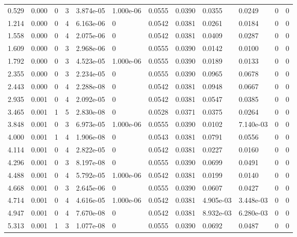 \documentclass[preview]{standalone}
\begin{document}
{{\begin{tabular}{L{1.2cm}C{1.2cm} C{0.3cm}C{0.5cm} C{1.4cm}C{1.4cm} C{1.4cm}C{1.4cm} C{1.6cm}C{1.6cm} C{1.6cm}C{1.6cm}}
  0.529  &  0.000  & 0     &  3 &  3.874e-05  & 1.000e-06  &  0.0555&   0.0390& 0.0355 & 0.0249   &  0 & 0  \\ 
  1.214  &  0.000  & 0     &  4 &  6.163e-06  & 0  &  0.0542&   0.0381& 0.0261 & 0.0184   &  0 & 0  \\ 
  1.558  &  0.000  & 0     &  4 &  2.075e-06  & 0  &  0.0542&   0.0381& 0.0409 & 0.0287   &  0 & 0  \\ 
  1.609  &  0.000  & 0     &  3 &  2.968e-06  & 0  &  0.0555&   0.0390& 0.0142 & 0.0100   &  0 & 0  \\ 
  1.792  &  0.000  & 0     &  3 &  4.523e-05  & 1.000e-06  &  0.0555&   0.0390& 0.0189 & 0.0133   &  0 & 0  \\ 
  2.355  &  0.000  & 0     &  3 &  2.234e-05  & 0  &  0.0555&   0.0390& 0.0965 & 0.0678   &  0 & 0  \\ 
  2.443  &  0.000  & 0     &  4 &  2.288e-08  & 0  &  0.0542&   0.0381& 0.0948 & 0.0667   &  0 & 0  \\ 
  2.935  &  0.001  & 0     &  4 &  2.092e-05  & 0  &  0.0542&   0.0381& 0.0547 & 0.0385   &  0 & 0  \\ 
  3.465  &  0.001  & 1     &  5 &  2.830e-08  & 0  &  0.0528&   0.0371& 0.0375 & 0.0264   &  0 & 0  \\ 
  3.848  &  0.001  & 0     &  3 &  6.973e-05  & 1.000e-06  &  0.0555&   0.0390& 0.0102 & 7.140e-03   &  0 & 0  \\ 
  4.000  &  0.001  & 1     &  4 &  1.906e-08  & 0  &  0.0543&   0.0381& 0.0791 & 0.0556   &  0 & 0  \\ 
  4.114  &  0.001  & 0     &  4 &  2.822e-05  & 0  &  0.0542&   0.0381& 0.0227 & 0.0160   &  0 & 0  \\ 
  4.296  &  0.001  & 0     &  3 &  8.197e-08  & 0  &  0.0555&   0.0390& 0.0699 & 0.0491   &  0 & 0  \\ 
  4.488  &  0.001  & 0     &  4 &  5.792e-05  & 1.000e-06  &  0.0542&   0.0381& 0.0199 & 0.0140   &  0 & 0  \\ 
  4.668  &  0.001  & 0     &  3 &  2.645e-06  & 0  &  0.0555&   0.0390& 0.0607 & 0.0427   &  0 & 0  \\ 
  4.714  &  0.001  & 0     &  4 &  4.616e-05  & 1.000e-06  &  0.0542&   0.0381& 4.905e-03 & 3.448e-03   &  0 & 0  \\ 
  4.947  &  0.001  & 0     &  4 &  7.670e-08  & 0  &  0.0542&   0.0381& 8.932e-03 & 6.280e-03   &  0 & 0  \\ 
  5.313  &  0.001  & 1     &  3 &  1.077e-08  & 0  &  0.0555&   0.0390& 0.0692 & 0.0487   &  0 & 0  \\ 

\end{tabular}}}
\end{document}
